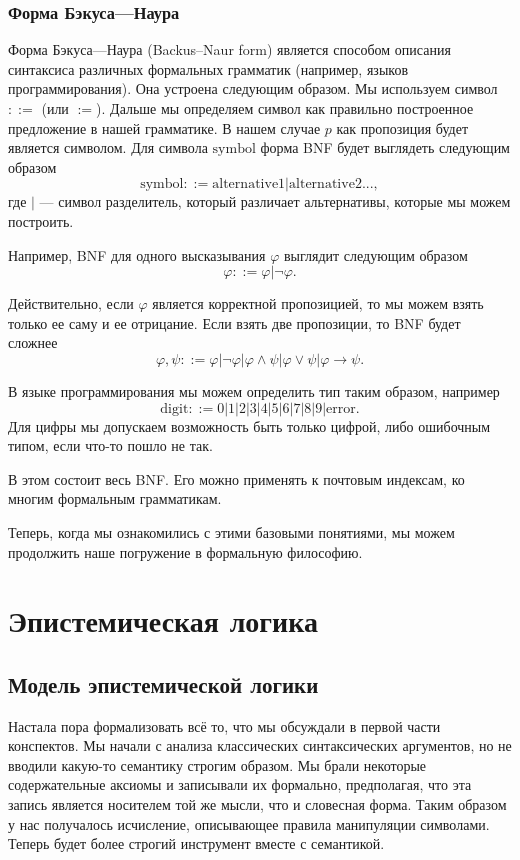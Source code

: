 \documentclass[openany]{book}
\theoremstyle{plain}
\theoremstyle{definition}
\begin{document}
\subsection{Форма Бэкуса---Наура}

Форма Бэкуса---Наура (Backus–Naur form) является способом описания синтаксиса различных формальных грамматик (например, языков программирования). Она устроена следующим образом. Мы используем символ \(::=\) (или \(:=\)). Дальше мы определяем символ как правильно построенное предложение в нашей грамматике. В нашем случае \(p\) как пропозиция будет является символом. Для символа \(\mathrm{symbol}\) форма BNF будет выглядеть следующим образом \[\mathrm{symbol} ::= \mathrm{alternative1} | \mathrm{alternative2} ...,\]
где \(|\) --- символ разделитель, который различает альтернативы, которые мы можем построить.

Например, BNF для одного высказывания \(\varphi\) выглядит следующим образом \[\varphi ::= \varphi | \neg \varphi.\]

Действительно, если \(\varphi\) является корректной пропозицией, то мы можем взять только ее саму и ее отрицание. Если взять две пропозиции, то BNF будет сложнее \[\varphi, \psi ::= \varphi | \neg \varphi | \varphi \land \psi | \varphi \lor \psi | \varphi \to \psi. \]

В языке программирования мы можем определить тип таким образом, например \[\mathrm{digit} ::= 0 | 1 | 2 | 3 | 4 | 5 | 6 | 7 | 8 | 9 | \mathrm{error}.\] Для цифры мы допускаем возможность быть только цифрой, либо ошибочным типом, если что-то пошло не так.

В этом состоит весь BNF. Его можно применять к почтовым индексам, ко многим формальным грамматикам.

Теперь, когда мы ознакомились с этими базовыми понятиями, мы можем продолжить наше погружение в формальную философию.

\chapter{Эпистемическая логика}

\section{Модель эпистемической логики}

Настала пора формализовать всё то, что мы обсуждали в первой части конспектов. Мы начали с анализа классических синтаксических аргументов, но не вводили какую-то семантику строгим образом. Мы брали некоторые содержательные аксиомы и записывали их формально, предполагая, что эта запись является носителем той же мысли, что и словесная форма. Таким образом у нас получалось исчисление, описывающее правила манипуляции символами. Теперь будет более строгий инструмент вместе с семантикой.
\end{document}
